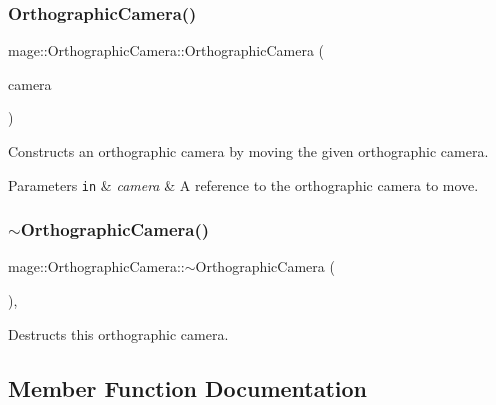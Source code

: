 \subsubsection{\texorpdfstring{Orthographic\+Camera()}{OrthographicCamera()}\hspace{0.1cm}{\footnotesize\ttfamily [3/3]}}
{\footnotesize\ttfamily mage\+::\+Orthographic\+Camera\+::\+Orthographic\+Camera (\begin{DoxyParamCaption}\item[{\hyperlink{classmage_1_1_orthographic_camera}{Orthographic\+Camera} \&\&}]{camera }\end{DoxyParamCaption})\hspace{0.3cm}{\ttfamily [default]}}

Constructs an orthographic camera by moving the given orthographic camera.


\begin{DoxyParams}[1]{Parameters}
\mbox{\tt in}  & {\em camera} & A reference to the orthographic camera to move. \\
\hline
\end{DoxyParams}
\hypertarget{classmage_1_1_orthographic_camera_ac7d1f4ce12a5d0a2539b610f14f59304}{}\label{classmage_1_1_orthographic_camera_ac7d1f4ce12a5d0a2539b610f14f59304} 
\subsubsection{\texorpdfstring{$\sim$\+Orthographic\+Camera()}{~OrthographicCamera()}}
{\footnotesize\ttfamily mage\+::\+Orthographic\+Camera\+::$\sim$\+Orthographic\+Camera (\begin{DoxyParamCaption}{ }\end{DoxyParamCaption})\hspace{0.3cm}{\ttfamily [virtual]}, {\ttfamily [default]}}

Destructs this orthographic camera. 

\subsection{Member Function Documentation}
\hypertarget{classmage_1_1_orthographic_camera_a873f0a715743a7dc104935995696dd33}{}\label{classmage_1_1_orthographic_camera_a873f0a715743a7dc104935995696dd33} 
